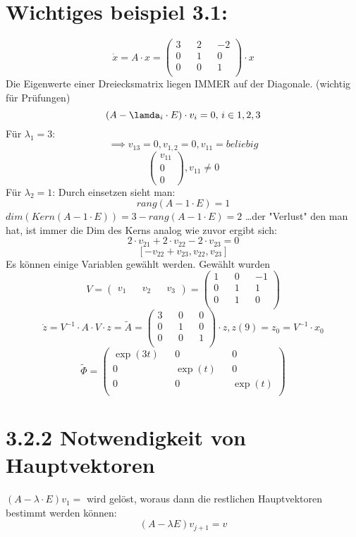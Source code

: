 \documentclass[a4paper]{article}
\begin{document}
\section*{Wichtiges beispiel 3.1:}
\[\dot x = A \cdot x = 
\begin{pmatrix}
3 && 2 && -2\\
0 && 1 && 0\\
0 && 0 && 1\\
\end{pmatrix}\cdot x\]
Die Eigenwerte einer Dreiecksmatrix liegen IMMER auf der Diagonale. (wichtig für Prüfungen)
\[(A-\lamda_{i}\cdot E)\cdot v_i=0$, $i \in {1,2,3}\]
Für $\lambda_1=3$:
\[\implies v_{13}=0, v_{1,2}=0, v_{11}=beliebig\]
\[\begin{pmatrix} v_{11}\\ 0\\ 0\end{pmatrix}, v_{11}\neq 0\]
Für $\lambda_2=1$:
Durch einsetzen sieht man:
\[rang(A-1\cdot E)=1\]
$dim(Kern(A-1\cdot E))=3-rang(A-1\cdot E)=2$  \ldots der "Verlust" den man hat, ist immer die Dim des Kerns
analog wie zuvor ergibt sich:
\[2\cdot v_{21}+2\cdot v_{22}-2\cdot v_{23}=0\]
\[[-v_{22}+v_{23}, v_{22}, v_{23}]\]
Es können einige Variablen gewählt werden. Gewählt wurden
\[V=\begin{pmatrix} v_{1}&& v_{2}&& v_{3}\end{pmatrix}=\begin{pmatrix}
1 && 0 && -1\\
0 && 1 && 1\\
0 && 1 && 0\\
\end{pmatrix}\]
\[\dot z =V^{-1}\cdot A\cdot V\cdot z=\tilde A=\begin{pmatrix}
3 && 0 && 0\\
0 && 1 && 0\\
0 && 0 && 1\\
\end{pmatrix}\cdot z, z(9)=z_0=V^{-1}\cdot x_0\]
\[\tilde \Phi=\begin{pmatrix}
\exp(3t) && 0 && 0\\
0 && \exp(t) && 0\\
0 && 0 && \exp(t)\\
\end{pmatrix}\]

\section*{3.2.2 Notwendigkeit von Hauptvektoren}
$(A-\lambda \cdot E)v_1=$ wird gelöst, woraus dann die restlichen Hauptvektoren bestimmt werden können:
\[(A-\lambda E)v_{j+1}=v\]
\end{document}
